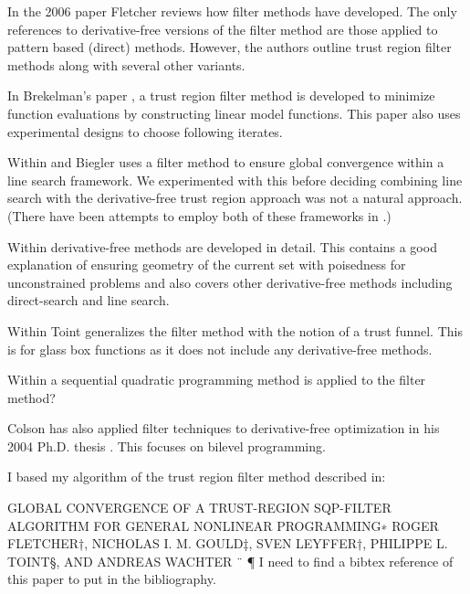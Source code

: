 \documentclass{article}
\begin{document}
In the 2006 paper \cite{DUMMY:Fletcher} Fletcher reviews how filter methods have developed. The only references to derivative-free versions of the filter method are those applied to pattern based (direct) methods. However, the authors outline trust region filter methods along with several other variants.

In Brekelman's paper \cite{DUMMY:Brekelman}, a trust region filter method is developed to minimize function evaluations by constructing linear model functions. This paper also uses experimental designs to choose following iterates.


Within \cite{DUMMY:linesearch_global} and \cite{DUMMY:linesearch_local} Biegler uses a filter method to ensure global convergence within a line search framework. We experimented with this before deciding combining line search with the derivative-free trust region approach was not a natural approach. (There have been attempts to employ both of these frameworks in \cite{DUMMY:CombineTrustAndLine}.)


Within  \cite{DUMMY:intro_book} derivative-free methods are developed in detail. This contains a good explanation of ensuring geometry of the current set with poisedness for unconstrained problems and also covers other derivative-free methods including direct-search and line search.


Within \cite{DUMMY:trust_funnel_dfo} Toint generalizes the filter method with the notion of a trust funnel. This is for glass box functions as it does not include any derivative-free methods.


Within \cite{DUMMY:sqp_filter} a sequential quadratic programming method is applied to the filter method?


Colson has also applied filter techniques to derivative-free optimization in his 2004 Ph.D. thesis \cite{Colson2004}. This focuses on bilevel programming.


I based my algorithm of the trust region filter method described in:

GLOBAL CONVERGENCE OF A TRUST-REGION SQP-FILTER
ALGORITHM FOR GENERAL NONLINEAR PROGRAMMING∗
ROGER FLETCHER†, NICHOLAS I. M. GOULD‡, SVEN LEYFFER†,
PHILIPPE L. TOINT§, AND ANDREAS WACHTER ¨ ¶
I need to find a bibtex reference of this paper to put in the bibliography.



\end{document}
